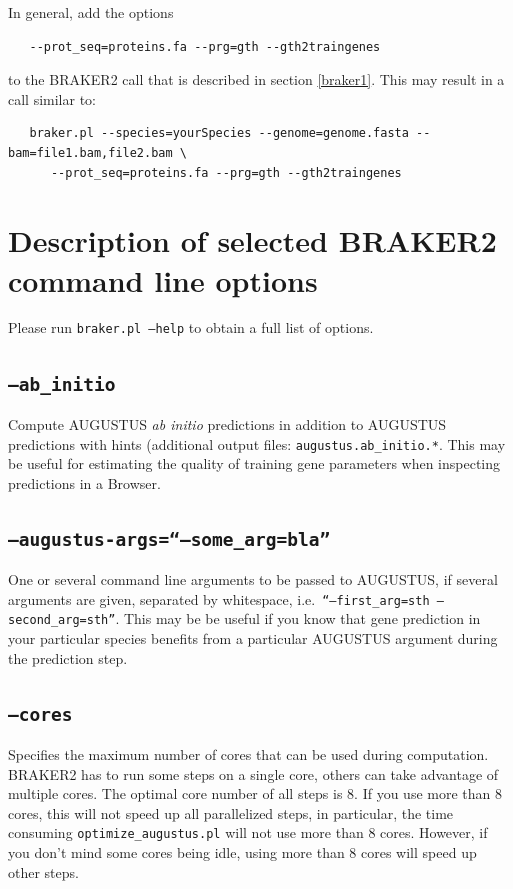 \documentclass[a4paper,10pt]{report}
\begin{document}
In general, add the options

\begin{verbatim}
   --prot_seq=proteins.fa --prg=gth --gth2traingenes
\end{verbatim}

to the BRAKER2 call that is described in section \ref{braker1}. This may result in a call similar to:

\begin{verbatim}
   braker.pl --species=yourSpecies --genome=genome.fasta --bam=file1.bam,file2.bam \
      --prot_seq=proteins.fa --prg=gth --gth2traingenes
\end{verbatim}

\section{Description of selected BRAKER2 command line options}\label{options}

Please run \texttt{braker.pl --help} to obtain a full list of options.

\subsection{\texttt{--ab\_initio}}

Compute AUGUSTUS \textit{ab initio} predictions in addition to AUGUSTUS predictions with hints (additional output files: \texttt{augustus.ab\_initio.*}. This may be useful for estimating the quality of training gene parameters when inspecting predictions in a Browser.

\subsection{\texttt{--augustus-args=``--some\_arg=bla''}}     
One or several command line arguments to be passed to AUGUSTUS, if several arguments are given, separated by whitespace, i.e.~\texttt{``--first\_arg=sth --second\_arg=sth''}. This may be be useful if you know that gene prediction in your particular species benefits from a particular AUGUSTUS argument during the prediction step.  
    
\subsection{\texttt{--cores}}                              Specifies the maximum number of cores that can be used during computation. BRAKER2 has to run some steps on a single core, others can take advantage of multiple cores. The optimal core number of all steps is 8. If you use more than 8 cores, this will not speed up all parallelized steps, in particular, the time consuming \texttt{optimize\_augustus.pl} will not use more than 8 cores. However, if you don't mind some cores being idle, using more than 8 cores will speed up other steps.
\end{document}
